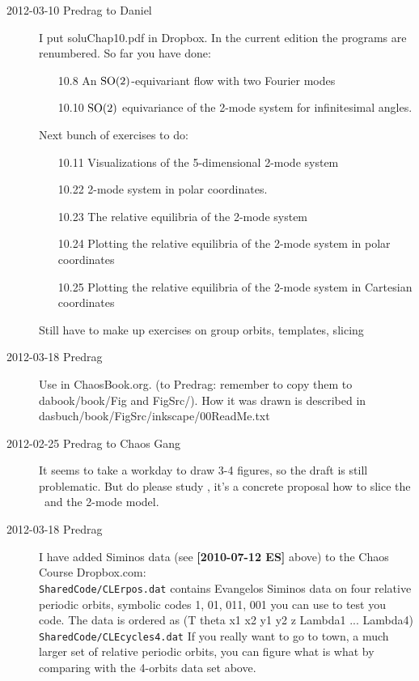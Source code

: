 \begin{description}
\item[2012-03-10 Predrag to Daniel] I put soluChap10.pdf in Dropbox. In
the current edition the programs are renumbered. So far you have done:
\begin{itemize}
  \item[10.8]  An $\textrm{SO}(2)$-equivariant flow with two Fourier modes
  \item[10.10] $\textrm{SO}(2)$ equivariance of the 2-mode system
           for infinitesimal angles.
\end{itemize}
Next bunch of exercises to do:
\begin{itemize}
  \item[10.11] Visualizations of the 5-dimensional 2-mode system
  \item[10.22] 2-mode system in polar coordinates.
  \item[10.23] The relative equilibria of the 2-mode system
  \item[10.24] Plotting the relative equilibria of
           the 2-mode system in polar coordinates
  \item[10.25] Plotting the relative equilibria of
           the 2-mode system in Cartesian coordinates
\end{itemize}

Still have to make up exercises on group orbits, templates, slicing


\item[2012-03-18 Predrag]               \toCB
Use  in ChaosBook.org. (to Predrag: remember to
copy them to dabook/book/Fig and FigSrc/). How it was drawn is described
in dasbuch/book/FigSrc/inkscape/00ReadMe.txt


\item[2012-02-25 Predrag to Chaos Gang]
It seems to take a workday to draw 3-4 figures, so the draft is still
problematic. But do please study , it's a
concrete proposal how to slice the \cLf\ and the 2-mode model.

\item[2012-03-18 Predrag] I have added Siminos data (see {\bf [2010-07-12
ES]} above) to the Chaos Course Dropbox.com:
\\
          \texttt{SharedCode/CLErpos.dat}
            contains Evangelos Siminos data on four relative periodic
            orbits, symbolic codes 1, 01, 011, 001 you can use to test
            you code. The data is ordered as
            (T theta x1 x2 y1 y2 z Lambda1 ... Lambda4)
\\
          \texttt{SharedCode/CLEcycles4.dat}
            If you really want to go to town, a much larger set of
            relative periodic orbits, you can figure what is what by
            comparing with the 4-orbits data set above.


\end{description}
